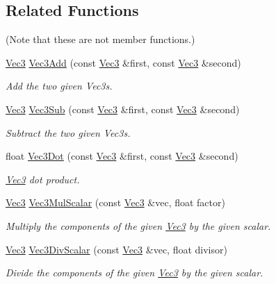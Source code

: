 \subsection*{Related Functions}
(Note that these are not member functions.) {\bf }\par
\begin{DoxyCompactItemize}
\item 
\hyperlink{classgfxmath_1_1_vec3}{Vec3} \hyperlink{classgfxmath_1_1_vec3_ac3979900225f137a1486a4491d0fb6d8}{Vec3\+Add} (const \hyperlink{classgfxmath_1_1_vec3}{Vec3} \&first, const \hyperlink{classgfxmath_1_1_vec3}{Vec3} \&second)
\begin{DoxyCompactList}\small\item\em Add the two given Vec3s. \end{DoxyCompactList}\item 
\hyperlink{classgfxmath_1_1_vec3}{Vec3} \hyperlink{classgfxmath_1_1_vec3_ae7189108aa879fb16ce9afd17052ac16}{Vec3\+Sub} (const \hyperlink{classgfxmath_1_1_vec3}{Vec3} \&first, const \hyperlink{classgfxmath_1_1_vec3}{Vec3} \&second)
\begin{DoxyCompactList}\small\item\em Subtract the two given Vec3s. \end{DoxyCompactList}\item 
float \hyperlink{classgfxmath_1_1_vec3_a02eb26d5238095f747d35890a597e489}{Vec3\+Dot} (const \hyperlink{classgfxmath_1_1_vec3}{Vec3} \&first, const \hyperlink{classgfxmath_1_1_vec3}{Vec3} \&second)
\begin{DoxyCompactList}\small\item\em \hyperlink{classgfxmath_1_1_vec3}{Vec3} dot product. \end{DoxyCompactList}\item 
\hyperlink{classgfxmath_1_1_vec3}{Vec3} \hyperlink{classgfxmath_1_1_vec3_a79475199c50b1ee42edc6aa8b5c5795f}{Vec3\+Mul\+Scalar} (const \hyperlink{classgfxmath_1_1_vec3}{Vec3} \&vec, float factor)
\begin{DoxyCompactList}\small\item\em Multiply the components of the given \hyperlink{classgfxmath_1_1_vec3}{Vec3} by the given scalar. \end{DoxyCompactList}\item 
\hyperlink{classgfxmath_1_1_vec3}{Vec3} \hyperlink{classgfxmath_1_1_vec3_a8c2d0c0b9d70b417e598489374ef1f88}{Vec3\+Div\+Scalar} (const \hyperlink{classgfxmath_1_1_vec3}{Vec3} \&vec, float divisor)
\begin{DoxyCompactList}\small\item\em Divide the components of the given \hyperlink{classgfxmath_1_1_vec3}{Vec3} by the given scalar. \end{DoxyCompactList}\item 

\end{DoxyCompactItemize}
